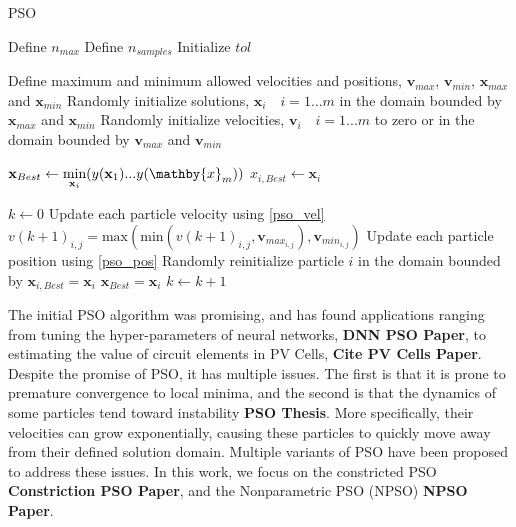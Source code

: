 \begin{breakablealgorithm}
\caption{PSO}\label{pso_algorithm}
\begin{algorithmic}[1]
\State Define $n_{max}$ 
\State Define $n_{samples}$ 
\State Initialize $tol$  
\EndProcedure

\State Define maximum and minimum allowed velocities and positions, $\mathbf{v}_{max}$, $\mathbf{v}_{min}$, $\mathbf{x}_{max}$ and $\mathbf{x}_{min}$
\State Randomly initialize solutions, $\mathbf{x}_i \quad i=1...m$ in the domain bounded by $\mathbf{x}_{max}$ and $\mathbf{x}_{min}$
\State Randomly initialize velocities, $\mathbf{v}_i \quad i=1...m$ to zero or in the domain bounded by $\mathbf{v}_{max}$ and $\mathbf{v}_{min}$
\EndProcedure

\State $\mathbf{x}_{Best} \leftarrow \underset{\mathbf{x}_i}{\textrm{min}}(y(\mathbf{x}_1)...y(\mathby{x}_m))$
    \State $x_{i,Best} \leftarrow \mathbf{x}_i$
\EndFor
\EndProcedure

\State $k \leftarrow 0$
    \State Update each particle velocity using \ref{pso_vel}
    \State $v(k+1)_{i,j} = \textrm{max}(\textrm{min}(v(k+1)_{i,j},\mathbf{v}_{max}_{i,j}),\mathbf{v}_{min}_{i,j})$
    \EndIf
    \State Update each particle position using \ref{pso_pos}
    \State Randomly reinitialize particle $i$ in the domain bounded by 
    \EndIf
            \State $\mathbf{x}_{i,Best} = \mathbf{x}_i$
        \EndIf
            \State $\mathbf{x}_{Best} = \mathbf{x}_i$
        \EndIf
    \EndFor
    $k \leftarrow k+1$
\EndWhile
\EndProcedure
\end{algorithmic}
\end{breakablealgorithm}

The initial PSO algorithm was promising, and has found applications ranging from tuning the hyper-parameters of neural networks, \textbf{DNN PSO Paper}, to estimating the value of circuit elements in PV Cells, \textbf{Cite PV Cells Paper}. Despite the promise of PSO, it has multiple issues. The first is that it is prone to premature convergence to local minima, and the second is that the dynamics of some particles tend toward instability \textbf{PSO Thesis}. More specifically, their velocities can grow exponentially, causing these particles to quickly move away from their defined solution domain. Multiple variants of PSO have been proposed to address these issues. In this work, we focus on the constricted PSO \textbf{Constriction PSO Paper}, and the Nonparametric PSO (NPSO) \textbf{NPSO Paper}.

